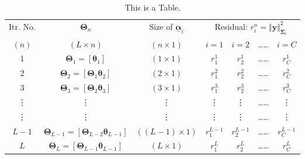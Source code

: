 \begin{table}[h]
\centering
\begin{tabular}{|c|c|c|c|c|c|c|}
\hline
Itr. No. & $\boldsymbol \Theta_n$ & Size of $\underline{\boldsymbol \alpha}_i$ & \multicolumn{4}{c|}{Residual: $r_i^n = \Vert \mathbf{y} \Vert_{\boldsymbol \Sigma_i}^{2}$ }\\ \cline{4-7}
$(n)$ & $(L \times n)$ & $(n \times 1)$ &
$i=1$ & $i=2$ & \dots \dots & $i=C$ \\
\hline
1 & $\boldsymbol \Theta_1 = [\boldsymbol \theta_1]$ & $(1 \times 1)$ & $r_1^1$
& $r_2^1$
& \dots \dots & $r_C^1$ \\
\hline
2 & $\boldsymbol \Theta_2 = [\boldsymbol \Theta_1 \boldsymbol \theta_2]$ & $(2 \times 1)$ &  $r_1^2$ & $r_2^2$
& \dots \dots & $r_C^2$  \\
\hline
3 & $\boldsymbol \Theta_3 = [\boldsymbol \Theta_2 {\boldsymbol \theta_3}]$ & $(3 \times 1)$ & $r_1^3$ & $r_2^3$
& \dots \dots & $r_C^3$  \\
\hline
\vdots & \vdots & \vdots & \vdots & \vdots & \dots \dots & \vdots \\
\vdots & \vdots & \vdots & \vdots & \vdots & \dots \dots & \vdots \\
\hline
$L-1$ & $\boldsymbol \Theta_{L-1} = [\boldsymbol \Theta_{L-2} {\boldsymbol \theta_{L-1}}]$ & $((L-1) \times 1)$ & $r_1^{L-1}$ & $r_2^{L-1}$
& \dots \dots & $r_C^{L-1}$\\
\hline
$L$ & $\boldsymbol \Theta_L = [\boldsymbol \Theta_{L-1} {\boldsymbol \theta_{L-1}}]$ & $(L \times 1)$ &  $r_1^L$ & $r_2^L$
& \dots \dots & $r_C^L$  \\
\hline
\end{tabular}
\caption{This is a Table.}
\label{tab:Table}
\end{table}